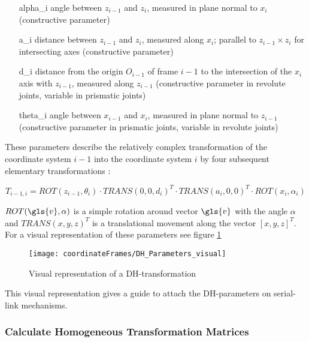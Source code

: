 \begin{enumerate}[label=\emph{\arabic*)}]
	\item[\gls{alpha_i}] angle between $z_{i-1}$ and $z_i$, measured in plane normal to $x_i$ (constructive parameter)
	\item[\gls{a_i}] distance between $z_{i-1}$ and $z_i$, measured along $x_i$; parallel to $z_{i-1} \times z_i$ for intersecting axes (constructive parameter)
	\item[\gls{d_i}] distance from the origin $O_{i-1}$ of frame $i-1$ to the intersection of the $x_i$ axis with $z_{i-1}$, measured along $z_{i-1}$ (constructive parameter in revolute joints, variable in prismatic joints)
	\item[\gls{theta_i}] angle between $x_{i-1}$ and $x_i$, measured in plane normal to $z_{i-1}$ (constructive parameter in prismatic joints, variable in revolute joints)
\end{enumerate}

These parameters describe the relatively complex transformation of the coordinate system $i-1$ into the coordinate system $i$ by four subsequent elementary transformations \cite{allgInvKin}:

\begin{equation} \label{eq:DH-Transform}
T_{i-1,i}=ROT(z_{i-1}, \theta_i) \cdot TRANS(0,0,d_i)^T \cdot TRANS(a_i,0,0)^T \cdot ROT(x_i,\alpha_i)
\end{equation}

$ROT(\gls{v},\alpha)$ is a simple rotation around vector $\gls{v}$ with the angle $\alpha$ and $TRANS(x,y,z)^T$ is a translational movement along the vector $[x,y,z]^T$. For a visual representation of these parameters see figure \ref{fig:DH_Parameters_visual} 

\begin{figure}[H]
	\texttt{[image: coordinateFrames/DH\_Parameters\_visual]}
	\caption{Visual representation of a \ac{DH}-transformation}
	\label{fig:DH_Parameters_visual}
\end{figure}

This visual representation gives a guide to attach the \ac{DH}-parameters on serial-link mechanisms.


\subsubsection{Calculate Homogeneous Transformation Matrices}

